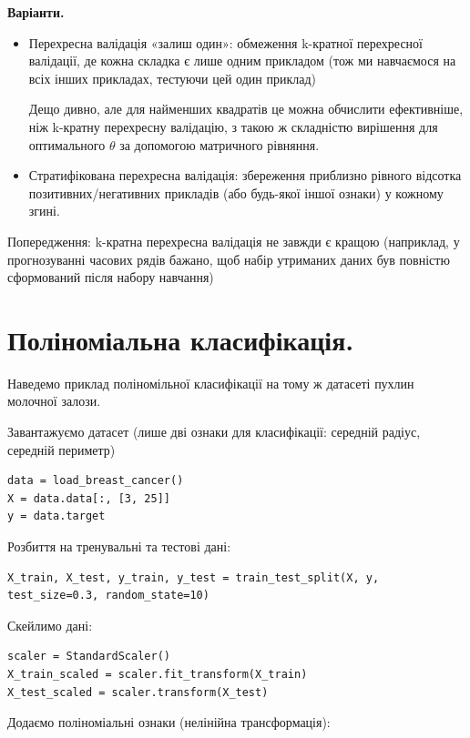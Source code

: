 \textbf{Варіанти.}

\begin{itemize}
\item Перехресна валідація «залиш один»: обмеження k-кратної перехресної валідації, де кожна 
складка є лише одним прикладом (тож ми навчаємося на всіх інших прикладах, тестуючи 
цей один приклад)

Дещо дивно, але для найменших квадратів це можна обчислити ефективніше, ніж k-кратну 
перехресну валідацію, з такою ж складністю вирішення для оптимального $\theta$ за допомогою матричного рівняння.

\item Стратифікована перехресна валідація: збереження приблизно рівного відсотка 
позитивних/негативних прикладів (або будь-якої іншої ознаки) у кожному згині.
\end{itemize}

 Попередження: k-кратна перехресна валідація не завжди є кращою (наприклад, у прогнозуванні часових рядів 
бажано, щоб набір утриманих даних був повністю сформований після набору навчання)



\section{Поліноміальна класифікація.}

Наведемо приклад поліномільної класифікації на тому ж датасеті пухлин молочної залози.

Завантажуємо датасет (лише дві ознаки для класифікації: середній радіус, середній периметр)

\begin{lstlisting}
data = load_breast_cancer()
X = data.data[:, [3, 25]]
y = data.target
\end{lstlisting}

Розбиття на тренувальні та тестові дані:

\begin{lstlisting}
X_train, X_test, y_train, y_test = train_test_split(X, y, test_size=0.3, random_state=10)
\end{lstlisting}

Скейлимо дані:

\begin{lstlisting}
scaler = StandardScaler()
X_train_scaled = scaler.fit_transform(X_train)
X_test_scaled = scaler.transform(X_test)
\end{lstlisting}

Додаємо поліноміальні ознаки (нелінійна трансформація):

